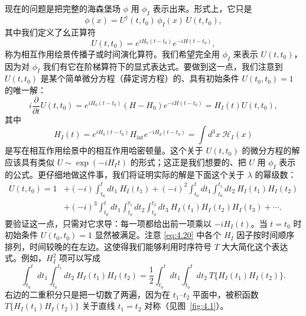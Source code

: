 现在的问题是把完整的海森堡场 $\phi$ 用 $\phi_I$ 表示出来。形式上，它只是
\begin{equation}
  \phi(x) = U^{\dagger}(t, t_0)\,\phi_I(x)\,U(t, t_0),
  \label{eq:4.16}
\end{equation}
其中我们定义了幺正算符
\begin{equation}
  U(t, t_0) = e^{iH_0(t-t_0)}e^{-iH(t-t_0)},
  \label{eq:4.17}
\end{equation}
称为相互作用绘景传播子或时间演化算符。我们希望完全用 $\phi_I$ 来表示 $U(t, t_0)$，因为对 $\phi_I$ 我们有它在阶梯算符下的显式表达式。要做到这一点，我们注意到 $U(t, t_0)$ 是某个简单微分方程（薛定谔方程）的、具有初始条件 $U(t_0, t_0) = 1$ 的唯一解：
\begin{equation}
  i\frac{\partial}{\partial t}U(t, t_0)
    = e^{iH_0(t-t_0)}(H-H_0)e^{-iH(t-t_0)}
    = H_I(t)U(t, t_0),
  \label{eq:4.18}
\end{equation}
其中
\begin{equation}
  H_I(t) = e^{iH_0(t-t_0)}H_{\mathrm{int}}e^{-iH_0(t-t_0)}
  = \int d^3x\ \mathcal{H}_I(x)
  \label{eq:4.19}
\end{equation}
是写在相互作用绘景中的相互作用哈密顿量。这个关于 $U(t, t_0)$ 的微分方程的解应该具有类似 $U \sim \exp(-iH_It)$ 的形式；这正是我们想要的、把 $U$ 用 $\phi_I$ 表示的公式。更仔细地做这件事，我们将证明实际的解是下面这个关于 $\lambda$ 的幂级数：
\begin{equation}
  \begin{aligned}
    U(t, t_0) = 1 &+ (-i)\int_{t_0}^{t}dt_1\ H_I(t_1)
      + (-i)^2\int_{t_0}^{t}dt_1\int_{t_0}^{t_1}dt_2\ H_I(t_1)H_I(t_2)\\
    &+ (-i)^3\int_{t_0}^{t}dt_1\int_{t_0}^{t_1}dt_2\int_{t_0}^{t_2}dt_3\
      H_I(t_1)H_I(t_2)H_I(t_3) + \cdots .
  \end{aligned}
  \label{eq:4.20}
\end{equation}
要验证这一点，只需对它求导：每一项都给出前一项乘以 $-iH_I(t)$。当 $t=t_0$ 时初始条件 $U(t_0, t_0) = 1$ 显然被满足。注意 \eqref{eq:4.20} 中各个 $H_I$ 因子按时间顺序排列，时间较晚的在左边。这使得我们能够利用时序符号 $T$ 大大简化这个表达式。例如，$H_I^2$ 项可以写成
\begin{equation}
  \int_{t_0}^{t}dt_1\int_{t_0}^{t_1}dt_2\ H_I(t_1)H_I(t_2)
    = \frac{1}{2}\int_{t_0}^{t}dt_1\int_{t_0}^{t}dt_2\
      T\{H_I(t_1)H_I(t_2)\} .
  \label{eq:4.21}
\end{equation}
右边的二重积分只是把一切数了两遍，因为在 $t_1$--$t_2$ 平面中，被积函数 $T\{H_I(t_1)H_I(t_2)\}$ 关于直线 $t_1 = t_2$ 对称（见图~\ref{fig:4.1}）。

